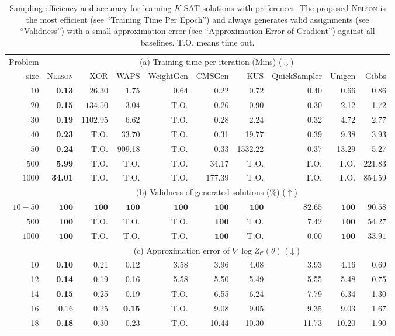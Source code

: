 \documentclass[letterpaper]{article} %
\newcommand{\nls}{\textsc{Nelson}\xspace}
\begin{document}
\begin{table}[!t]
    \centering
    \caption{Sampling efficiency and accuracy for learning $K$-SAT solutions with preferences. The proposed \nls is the most efficient (see ``Training Time Per Epoch'') and always generates valid assignments (see ``Validness'') with a small approximation error (see ``Approximation Error of Gradient'') against all baselines. T.O. means time out.}\label{tab:sampler}
    \begin{tabular}{r|rrrrrrrrr}
    \hline
      Problem &\multicolumn{9}{c}{{(a) Training time per iteration} (Mins) ($\downarrow$)} \\ \cline{2-10}
     size & \nls& XOR & WAPS & WeightGen & CMSGen & KUS &QuickSampler & Unigen & Gibbs\\ \hline
$10$   & \textbf{0.13}  & $26.30$   & $1.75$ & $0.64$     & $0.22$  & 0.72& 0.40 & 0.66  & 0.86 \\
$20$   & \textbf{0.15}  & $134.50$  & $3.04$ & {T.O.}    & 0.26  & 0.90& 0.30 & 2.12  & 1.72 \\
$30$   & \textbf{0.19}  & $1102.95$ & $6.62$ & {T.O.}     & 0.28  & 2.24& 0.32 & 4.72  & 2.77 \\
$40$   & \textbf{0.23}  & T.O.   & 33.70 & {T.O.}    & 0.31  & 19.77 & 0.39 & 9.38  & 3.93 \\
$50$   & \textbf{0.24}  & T.O.   & 909.18& {T.O.}    & 0.33  & 1532.22  & 0.37 & 13.29 & 5.27 \\
$500$  & \textbf{5.99}  & T.O.   & {T.O.} & {T.O.}      & 34.17   & {T.O.} & {T.O.}  & {T.O.}   & $221.83$ \\
$1000$ & \textbf{34.01} & T.O.   & {T.O.} & {T.O.}      & $177.39$    & {T.O.} & {T.O.}  & {T.O.}   & $854.59$\\
\hline
%
&\multicolumn{9}{c}{(b) Validness of generated solutions ($\%$) ($\uparrow$)} \\ \hline
$10-50$ &  $\mathbf{100}$ & $\mathbf{100}$  &  $\mathbf{100}$  & $\mathbf{100}$  &  $\mathbf{100}$  & $\mathbf{100}$  &  $82.65$ & $\mathbf{100}$  & $90.58$\\
$500$ &   $\mathbf{100}$  & T.O. &  T.O. & T.O. &  $\mathbf{100}$  & T.O. &  $7.42$ & $\mathbf{100}$  & $54.27$\\
$1000$ &   $\mathbf{100}$  & T.O. &  T.O. & T.O. &  $\mathbf{100}$  & T.O. &  $0.00$ & $\mathbf{100}$  & $33.91$\\
\hline
%
 & \multicolumn{9}{c}{(c) Approximation error of  $\nabla\log Z_{\mathcal{C}}(\theta)$ ($\downarrow$)} \\ \hline
    10 & \textbf{0.10} & 0.21 & 0.12   & 3.58 & 3.96  & 4.08  & 3.93  & 4.16  & 0.69 \\
12 & \textbf{0.14} & 0.19 & 0.16   & 5.58 & 5.50  & 5.49  & 5.55  & 5.48  & 0.75 \\
14 & \textbf{0.15} & 0.25 & 0.19   & T.O. & 6.55  & 6.24  & 7.79  & 6.34  & 1.30 \\
16 & 0.16   & 0.25 & \textbf{0.15} & T.O. & 9.08  & 9.05  & 9.35  & 9.03  & 1.67 \\
18 & \textbf{0.18} & 0.30 & 0.23   & T.O. & 10.44 & 10.30 & 11.73 & 10.20 & 1.90 \\
\hline
    \end{tabular}
\end{table}
\end{document}

